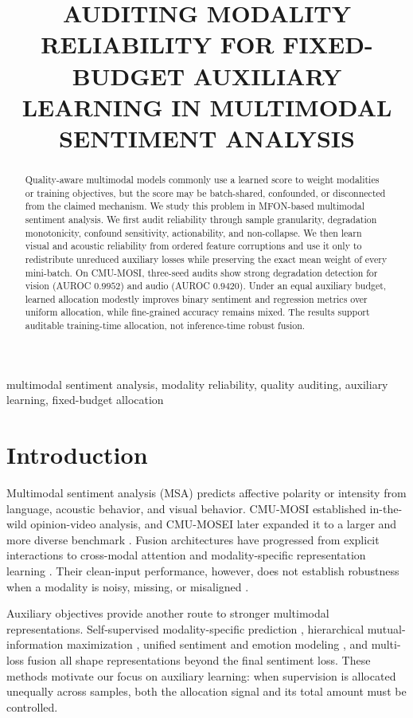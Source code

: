 \documentclass{article}
\title{AUDITING MODALITY RELIABILITY FOR FIXED-BUDGET AUXILIARY LEARNING IN MULTIMODAL SENTIMENT ANALYSIS}
\begin{document}
\maketitle

\begin{abstract}
Quality-aware multimodal models commonly use a learned score to weight modalities or training objectives, but the score may be batch-shared, confounded, or disconnected from the claimed mechanism. We study this problem in MFON-based multimodal sentiment analysis. We first audit reliability through sample granularity, degradation monotonicity, confound sensitivity, actionability, and non-collapse. We then learn visual and acoustic reliability from ordered feature corruptions and use it only to redistribute unreduced auxiliary losses while preserving the exact mean weight of every mini-batch. On CMU-MOSI, three-seed audits show strong degradation detection for vision (AUROC $0.9952$) and audio (AUROC $0.9420$). Under an equal auxiliary budget, learned allocation modestly improves binary sentiment and regression metrics over uniform allocation, while fine-grained accuracy remains mixed. The results support auditable training-time allocation, not inference-time robust fusion.
\end{abstract}

\begin{keywords}
multimodal sentiment analysis, modality reliability, quality auditing, auxiliary learning, fixed-budget allocation
\end{keywords}

\section{Introduction}
\label{sec:intro}

Multimodal sentiment analysis (MSA) predicts affective polarity or intensity from language, acoustic behavior, and visual behavior. CMU-MOSI established in-the-wild opinion-video analysis, and CMU-MOSEI later expanded it to a larger and more diverse benchmark \cite{zadeh2016multimodal,zadeh2018mosei}. Fusion architectures have progressed from explicit interactions \cite{zadeh2017tensor,liu2018efficient} to cross-modal attention and modality-specific representation learning \cite{tsai2019multimodal,hazarika2020misa,rahman2020integrating}. Their clean-input performance, however, does not establish robustness when a modality is noisy, missing, or misaligned \cite{hazarika2022robustness}.

Auxiliary objectives provide another route to stronger multimodal representations. Self-supervised modality-specific prediction \cite{yu2021learning}, hierarchical mutual-information maximization \cite{han2021improving}, unified sentiment and emotion modeling \cite{hu2022unimse}, and multi-loss fusion \cite{wu2024multimodal} all shape representations beyond the final sentiment loss. These methods motivate our focus on auxiliary learning: when supervision is allocated unequally across samples, both the allocation signal and its total amount must be controlled.
\end{document}
